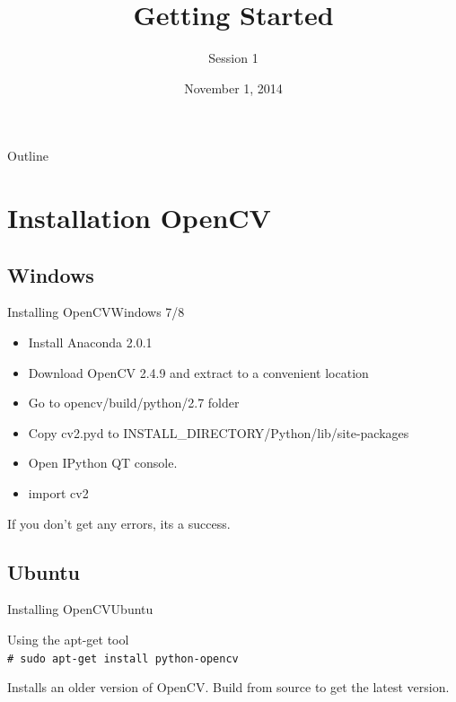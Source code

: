 \documentclass{beamer}
\title{Getting Started}
\subtitle{Session 1}
\institute[Computer Vision Group] %
{
  Computer Vision Group\\
  IIT Madras
}
\date{November 1, 2014}
\newcommand{\shellcmd}[1]{\\\indent\indent\texttt{\footnotesize\# #1}\\}  %
\begin{document}
\begin{frame}
  \titlepage
\end{frame}

\begin{frame}{Outline}
  \tableofcontents[sectionstyle=show/show,subsectionstyle=show/show,subsubsectionstyle=hide]
\end{frame}

\section{Installation OpenCV}

\subsection{Windows}

\begin{frame}{Installing OpenCV}{Windows 7/8}
  \begin{itemize}
  \item {
    Install Anaconda 2.0.1
  }
  \item {
    Download OpenCV 2.4.9 and extract to a convenient location
  }
  \item{
    Go to opencv/build/python/2.7 folder
  }
  \item{
    Copy cv2.pyd to INSTALL\_DIRECTORY/Python/lib/site-packages
  }
  \item{
    Open IPython QT console.
  }
  \item{
    import cv2
  }
  \end{itemize}
  If you don't get any errors, its a success.
\end{frame}

\subsection{Ubuntu}

\begin{frame}{Installing OpenCV}{Ubuntu}
\begin{block}{Using the apt-get tool}
\shellcmd{sudo apt-get install python-opencv}
\end{block}


Installs an older version of OpenCV. Build from source to get the latest version.
\end{frame}
\end{document}
